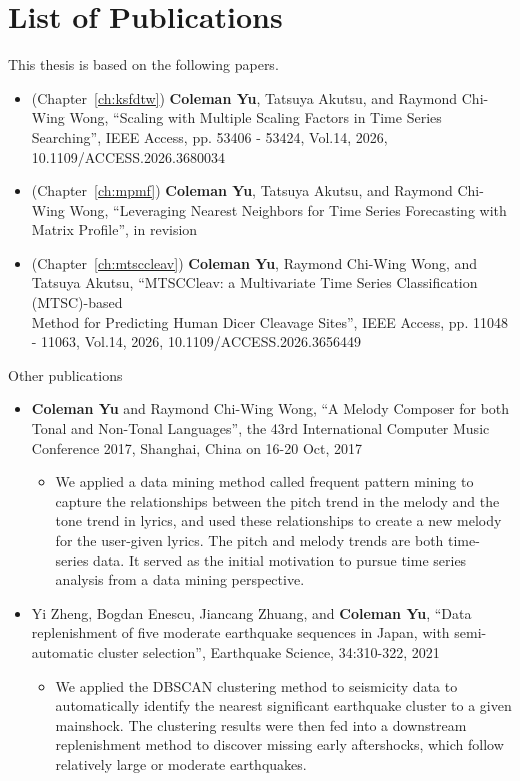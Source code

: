 \chapter*{List of Publications}
This thesis is based on the following papers.

\begin{itemize}
    \item (Chapter~\ref{ch:ksfdtw}) \textbf{Coleman Yu}, Tatsuya Akutsu, and Raymond Chi-Wing Wong, ``Scaling with Multiple Scaling Factors in Time Series Searching'', IEEE Access, pp. 53406 - 53424, Vol.14, 2026, 10.1109/ACCESS.2026.3680034
    \item (Chapter~\ref{ch:mpmf}) \textbf{Coleman Yu}, Tatsuya Akutsu, and Raymond Chi-Wing Wong, ``Leveraging Nearest Neighbors for Time Series Forecasting with Matrix Profile'', in revision
    \item (Chapter~\ref{ch:mtsccleav}) \textbf{Coleman Yu}, Raymond Chi-Wing Wong, and Tatsuya Akutsu, ``MTSCCleav: a Multivariate Time Series Classification (MTSC)-based \\Method for Predicting Human Dicer Cleavage Sites'', IEEE Access, pp. 11048 - 11063, Vol.14, 2026, 10.1109/ACCESS.2026.3656449
\end{itemize}


\noindent Other publications

\begin{itemize}
    \item \textbf{Coleman Yu} and Raymond Chi-Wing Wong, ``A Melody Composer for both Tonal and Non-Tonal Languages'', 
    the 43rd International Computer Music Conference 2017, Shanghai, China on 16-20 Oct, 2017
    \begin{itemize}
        \item We applied a data mining method called frequent pattern mining to capture the relationships between the pitch trend in the melody and the tone trend in lyrics, and used these relationships to create a new melody for the user-given lyrics. 
        The pitch and melody trends are both time-series data.
        It served as the initial motivation to pursue time series analysis from a data mining perspective.
    \end{itemize}
    \item Yi Zheng, Bogdan Enescu, Jiancang Zhuang, and \textbf{Coleman Yu}, ``Data replenishment of five moderate earthquake sequences in Japan, with semi-automatic cluster selection'',
    Earthquake Science, 34:310-322, 2021
    \begin{itemize}
        \item We applied the DBSCAN clustering method to seismicity data to automatically identify the nearest significant earthquake cluster to a given mainshock. 
        The clustering results were then fed into a downstream replenishment method to discover missing early aftershocks, which follow relatively large or moderate earthquakes.
    \end{itemize}
\end{itemize}

